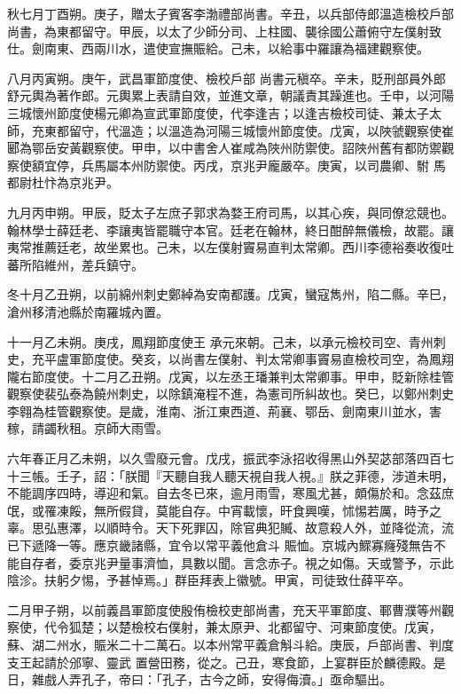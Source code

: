 \begin{pinyinscope}
 秋七月丁酉朔。庚子，贈太子賓客李渤禮部尚書。辛丑，以兵部侍郎溫造檢校戶部尚書，為東都留守。甲辰，以太了少師分司、上柱國、襲徐國公蕭俯守左僕射致仕。劍南東、西兩川水，遣使宣撫賑給。己未，以給事中羅讓為福建觀察使。



 八月丙寅朔。庚午，武昌軍節度使、檢校戶部
 尚書元稹卒。辛未，貶刑部員外郎舒元輿為著作郎。元輿累上表請自效，並進文章，朝議責其躁進也。壬申，以河陽三城懷州節度使楊元卿為宣武軍節度使，代李逢吉；以逢吉檢校司徒、兼太子太師，充東都留守，代溫造；以溫造為河陽三城懷州節度使。戊寅，以陜虢觀察使崔郾為鄂岳安黃觀察使。甲申，以中書舍人崔咸為陜州防禦使。詔陜州舊有都防禦觀察使額宜停，兵馬屬本州防禦使。丙戌，京兆尹龐嚴卒。庚寅，以司農卿、駙
 馬都尉杜忭為京兆尹。



 九月丙申朔。甲辰，貶太子左庶子郭求為婺王府司馬，以其心疾，與同僚忿競也。翰林學士薛廷老、李讓夷皆罷職守本官。廷老在翰林，終日酣醉無儀檢，故罷。讓夷常推薦廷老，故坐累也。己未，以左僕射竇易直判太常卿。西川李德裕奏收復吐蕃所陷維州，差兵鎮守。



 冬十月乙丑朔，以前綿州刺史鄭綽為安南都護。戊寅，蠻寇雋州，陷二縣。辛巳，滄州移清池縣於南羅城內置。



 十一月乙未朔。庚戌，鳳翔節度使王
 承元來朝。己未，以承元檢校司空、青州刺史，充平盧軍節度使。癸亥，以尚書左僕射、判太常卿事竇易直檢校司空，為鳳翔隴右節度使。十二月乙丑朔。戊寅，以左丞王璠兼判太常卿事。甲申，貶新除桂管觀察使裴弘泰為饒州刺史，以除鎮淹程不進，為憲司所糾故也。癸巳，以鄭州刺史李翱為桂管觀察使。是歲，淮南、浙江東西道、荊襄、鄂岳、劍南東川並水，害稼，請蠲秋租。京師大雨雪。



 六年春正月乙未朔，以久雪廢元會。戊戌，振武李泳招收得黑山外契苾部落四百七十三帳。壬子，詔：「朕聞『天聽自我人聽天視自我人視。』朕之菲德，涉道未明，不能調序四時，導迎和氣。自去冬已來，逾月雨雪，寒風尤甚，頗傷於和。念茲庶氓，或罹凍餒，無所假貸，莫能自存。中宵載懷，旰食興嘆，怵惕若厲，時予之辜。思弘惠澤，以順時令。天下死罪囚，除官典犯贓、故意殺人外，並降從流，流已下遞降一等。應京畿諸縣，宜令以常平義他倉斗
 賑恤。京城內鰥寡癃殘無告不能自存者，委京兆尹量事濟恤，具數以聞。言念赤子。視之如傷。天或警予，示此陰沴。扶躬夕惕，予甚悼焉。」群臣拜表上徽號。甲寅，司徒致仕薛平卒。



 二月甲子朔，以前義昌軍節度使殷侑檢校吏部尚書，充天平軍節度、鄆曹濮等州觀察使，代令狐楚；以楚檢校右僕射，兼太原尹、北都留守、河東節度使。戊寅，蘇、湖二州水，賑米二十二萬石。以本州常平義倉斛斗給。庚辰，戶部尚書、判度支王起請於邠寧、靈武
 置營田務，從之。己丑，寒食節，上宴群臣於麟德殿。是日，雜戲人弄孔子，帝曰：「孔子，古今之師，安得侮瀆。」亟命驅出。




\end{pinyinscope}
